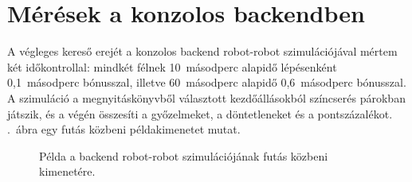 \section{Mérések a konzolos backendben}\label{sec:terminal}

A végleges kereső erejét a konzolos backend robot-robot szimulációjával mértem két időkontrollal: mindkét félnek 10~másodperc alapidő lépésenként 0,1~másodperc bónusszal, illetve 60~másodperc alapidő 0,6~másodperc bónusszal. A szimuláció a megnyitáskönyvből választott kezdőállásokból színcserés párokban játszik, és a végén összesíti a győzelmeket, a döntetleneket és a pontszázalékot. .~ábra egy futás közbeni példakimenetet mutat.

\begin{figure}[!ht]
	\centering
	\caption{Példa a backend robot-robot szimulációjának futás közbeni kimenetére.}
	\label{fig:terminal}
\end{figure}
